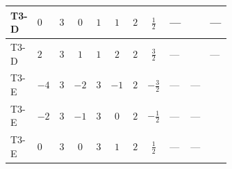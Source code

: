 \documentclass[8pt]{article}
\begin{document}
\begin{landscape}
\begin{longtable}{@{}llcccccc >{\raggedright\arraybackslash}p{0.21\linewidth} >{\raggedright\arraybackslash}p{0.21\linewidth} >{\raggedright\arraybackslash}p{0.21\linewidth}@{}}
\midrule
T3-D & $0$ & $3$ & $0$ & $1$ & $1$ & $2$ & $\frac{1}{2}$ & --- & \scriptsize\adjustbox{max width=\linewidth}{$\begin{gathered} {\lambda_5} (T_{\nu}^{(1)}+2 T_{\nu}^{(2)}+6 \operatorname{Tr}\!\left({Y_d}\,\left({Y_d}\right)^{\dagger}\right)+2 \operatorname{Tr}\!\left({Y_e}\,\left({Y_e}\right)^{\dagger}\right)+6 \operatorname{Tr}\!\left({Y_u}\,\left({Y_u}\right)^{\dagger}\right)-4 {\lambda_{HS_1}^{(A)}})\end{gathered}$} & --- \\
\midrule
T3-D & $2$ & $3$ & $1$ & $1$ & $2$ & $2$ & $\frac{3}{2}$ & --- & \scriptsize\adjustbox{max width=\linewidth}{$\begin{gathered} {\lambda_5} (T_{\nu}^{(1)}+2 T_{\nu}^{(2)}+6 \operatorname{Tr}\!\left({Y_d}\,\left({Y_d}\right)^{\dagger}\right)+2 \operatorname{Tr}\!\left({Y_e}\,\left({Y_e}\right)^{\dagger}\right)+6 \operatorname{Tr}\!\left({Y_u}\,\left({Y_u}\right)^{\dagger}\right)-4 {\lambda_{HS_1}^{(A)}})\end{gathered}$} & --- \\
\midrule
T3-E & $-4$ & $3$ & $-2$ & $3$ & $-1$ & $2$ & $-\frac{3}{2}$ & --- & --- & \scriptsize\adjustbox{max width=\linewidth}{$\begin{gathered} {\lambda_5} \left(T_{\nu}^{(1)}+T_{\nu}^{(2)}+6 \operatorname{Tr}\!\left({Y_d}\,\left({Y_d}\right)^{\dagger}\right)+2 \operatorname{Tr}\!\left({Y_e}\,\left({Y_e}\right)^{\dagger}\right)+6 \operatorname{Tr}\!\left({Y_u}\,\left({Y_u}\right)^{\dagger}\right)-\frac{4 {\lambda_{12}^{(A)}}}{3}-2 {\lambda_{12}^{(\times)}}-2 {\lambda_{HS_1}^{(A)}}-\frac{4 {\lambda_{HS_2}^{(A)}}}{3}\right)\end{gathered}$} \\
\midrule
T3-E & $-2$ & $3$ & $-1$ & $3$ & $0$ & $2$ & $-\frac{1}{2}$ & --- & --- & \scriptsize\adjustbox{max width=\linewidth}{$\begin{gathered} {\lambda_5} \left(T_{\nu}^{(1)}+T_{\nu}^{(2)}+6 \operatorname{Tr}\!\left({Y_d}\,\left({Y_d}\right)^{\dagger}\right)+2 \operatorname{Tr}\!\left({Y_e}\,\left({Y_e}\right)^{\dagger}\right)+6 \operatorname{Tr}\!\left({Y_u}\,\left({Y_u}\right)^{\dagger}\right)-\frac{4 {\lambda_{12}^{(A)}}}{3}-2 {\lambda_{12}^{(\times)}}-2 {\lambda_{HS_1}^{(A)}}-\frac{4 {\lambda_{HS_2}^{(A)}}}{3}\right)\end{gathered}$} \\
\midrule
T3-E & $0$ & $3$ & $0$ & $3$ & $1$ & $2$ & $\frac{1}{2}$ & --- & --- & \scriptsize\adjustbox{max width=\linewidth}{$\begin{gathered} {\lambda_5} \left(T_{\nu}^{(1)}+T_{\nu}^{(2)}+6 \operatorname{Tr}\!\left({Y_d}\,\left({Y_d}\right)^{\dagger}\right)+2 \operatorname{Tr}\!\left({Y_e}\,\left({Y_e}\right)^{\dagger}\right)+6 \operatorname{Tr}\!\left({Y_u}\,\left({Y_u}\right)^{\dagger}\right)-\frac{4 {\lambda_{12}^{(A)}}}{3}-2 {\lambda_{12}^{(\times)}}-2 {\lambda_{HS_1}^{(A)}}-\frac{4 {\lambda_{HS_2}^{(A)}}}{3}\right)\end{gathered}$} \\

\end{longtable}
\end{landscape}
\end{document}

